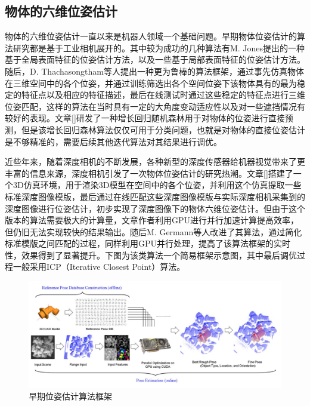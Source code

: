 \subsection{物体的六维位姿估计}

物体的六维位姿估计一直以来是机器人领域一个基础问题。早期物体位姿估计的算法研究都是基于工业相机展开的。其中较为成功的几种算法有M. Jones提出的一种基于全局表面特征的位姿估计方法\cite{jones2003fast}，以及一些基于局部表面特征的位姿估计方法\cite{schmid1996combining}\cite{rothganger20033d}。随后，D. Thachasongtham等人提出一种更为鲁棒的算法框架，通过事先仿真物体在三维空间中的各个位姿，并通过训练筛选出各个空间位姿下该物体具有的最为稳定的特征点以及相应的特征描述，最后在线测试时通过这些稳定的特征点进行三维位姿匹配\cite{thachasongtham20133d}，这样的算法在当时具有一定的大角度变动适应性以及对一些遮挡情况有较好的表现。文章[]研发了一种增长回归随机森林用于对物体的位姿进行直接预测，但是该增长回归森林算法仅仅可用于分类问题，也就是对物体的直接位姿估计是不够精准的，需要后续其他迭代算法对其结果进行调优。

近些年来，随着深度相机的不断发展，各种新型的深度传感器给机器视觉带来了更丰富的信息来源，深度相机引发了一次物体位姿估计的研究热潮。文章[]搭建了一个3D仿真环境，用于渲染3D模型在空间中的各个位姿，并利用这个仿真提取一些标准深度图像模版，最后通过在线匹配这些深度图像模版与实际深度相机采集到的深度图像进行位姿估计，初步实现了深度图像下的物体六维位姿估计。但由于这个版本的算法需要极大的计算量，文章作者利用GPU进行并行加速计算提高效率，但仍旧无法实现较快的结果输出。随后M. Germann等人改进了其算法，通过简化标准模版之间匹配的过程，同样利用GPU并行处理，提高了该算法框架的实时性，效果得到了显著提升\cite{park2010fast}。下图为该类算法一个简易框架示意图，其中最后调优过程一般采用ICP（Iterative Closest Point）算法。
\begin{figure}[htb]
	\centering 
	\includegraphics[width=\textwidth]{./mypic/早期位姿估计算法框架.jpg} 
	\caption{早期位姿估计算法框架} 
\end{figure}


